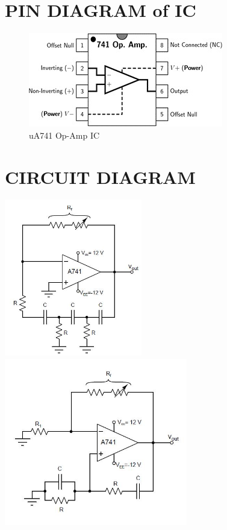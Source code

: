 \documentclass[12pt]{report}
\begin{document}
\chapter{PIN DIAGRAM of IC}
\label{cap:name2}
\vspace{2cm}
\begin{figure}[ht]
    \centering
    \includegraphics[scale=1.3]{figs/Pinout.jpeg}
    \caption{uA741 Op-Amp IC \cite{IC}}
    \label{fig:feedbacknet}
\end{figure}

\chapter{CIRCUIT DIAGRAM}
\label{cap:name2}

    \includegraphics[width=0.45\textwidth]{figs/RC_Phase_shift.jpeg}
    \includegraphics[width=0.6\textwidth]{figs/Wien_Bridge.jpeg}
\end{document}
